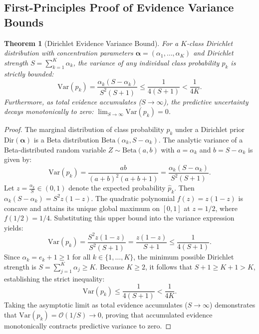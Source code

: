\documentclass[conference]{IEEEtran}
\newtheorem{theorem}{Theorem}
\begin{document}
\subsection{First-Principles Proof of Evidence Variance Bounds}
\begin{theorem}[Dirichlet Evidence Variance Bound]
\label{thm:dirichlet_variance}
For a $K$-class Dirichlet distribution with concentration parameters $\boldsymbol{\alpha} = (\alpha_1, \dots, \alpha_K)$ and Dirichlet strength $S = \sum_{k=1}^K \alpha_k$, the variance of any individual class probability $p_k$ is strictly bounded:
\begin{equation}
\mathrm{Var}(p_k) = \frac{\alpha_k (S - \alpha_k)}{S^2 (S + 1)} \le \frac{1}{4(S + 1)} < \frac{1}{4K}.
\end{equation}
Furthermore, as total evidence accumulates ($S \to \infty$), the predictive uncertainty decays monotonically to zero: $\lim_{S \to \infty} \mathrm{Var}(p_k) = 0$.
\end{theorem}

\begin{proof}
The marginal distribution of class probability $p_k$ under a Dirichlet prior $\mathrm{Dir}(\boldsymbol{\alpha})$ is a Beta distribution $\mathrm{Beta}(\alpha_k, S - \alpha_k)$. The analytic variance of a Beta-distributed random variable $Z \sim \mathrm{Beta}(a, b)$ with $a = \alpha_k$ and $b = S - \alpha_k$ is given by:
\begin{equation}
\mathrm{Var}(p_k) = \frac{a b}{(a + b)^2 (a + b + 1)} = \frac{\alpha_k(S - \alpha_k)}{S^2(S + 1)}.
\end{equation}
Let $z = \frac{\alpha_k}{S} \in (0, 1)$ denote the expected probability $\hat{p}_k$. Then $\alpha_k(S - \alpha_k) = S^2 z(1 - z)$. The quadratic polynomial $f(z) = z(1 - z)$ is concave and attains its unique global maximum on $[0, 1]$ at $z = 1/2$, where $f(1/2) = 1/4$. Substituting this upper bound into the variance expression yields:
\begin{equation}
\mathrm{Var}(p_k) = \frac{S^2 z(1 - z)}{S^2(S + 1)} = \frac{z(1 - z)}{S + 1} \le \frac{1}{4(S + 1)}.
\end{equation}
Since $\alpha_k = e_k + 1 \ge 1$ for all $k \in \{1, \dots, K\}$, the minimum possible Dirichlet strength is $S = \sum_{j=1}^K \alpha_j \ge K$. Because $K \ge 2$, it follows that $S + 1 \ge K + 1 > K$, establishing the strict inequality:
\begin{equation}
\mathrm{Var}(p_k) \le \frac{1}{4(S + 1)} < \frac{1}{4K}.
\end{equation}
Taking the asymptotic limit as total evidence accumulates ($S \to \infty$) demonstrates that $\mathrm{Var}(p_k) = \mathcal{O}(1/S) \to 0$, proving that accumulated evidence monotonically contracts predictive variance to zero.
\end{proof}
\end{document}

